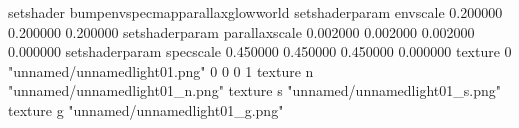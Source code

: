 setshader bumpenvspecmapparallaxglowworld
setshaderparam envscale 0.200000 0.200000 0.200000
setshaderparam parallaxscale 0.002000 0.002000 0.002000 0.000000
setshaderparam specscale 0.450000 0.450000 0.450000 0.000000
texture 0 "unnamed/unnamedlight01.png" 0 0 0 1
texture n "unnamed/unnamedlight01_n.png"
texture s "unnamed/unnamedlight01_s.png"
texture g "unnamed/unnamedlight01_g.png"
